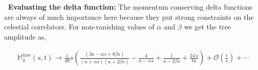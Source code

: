 \noindent
\textbullet \textbf{\, Evaluating the delta function:}
\noindent
The momentum conserving delta functions are always of much importance here because they put strong constraints on the celestial correlators. 
For non-vanishing values of $\alpha$ and $\beta $ we get the tree amplitude as,

\begin{align}
\mathbb{M}_4^{\textrm{tree}}(s,t)\to\frac{1}{48} s \left(\frac{ (3 \kappa-\alpha  s+8 \beta  s)}{(\kappa+\alpha  s) (\kappa+2 \beta  s)}-\frac{4 }{\kappa-\alpha  s}+\frac{1}{\kappa-2 \beta  s}+\frac{24 \,s }{t \kappa}\right)+\mathcal{O}\left(\frac{t}{s}\right)+\cdots
\end{align}

